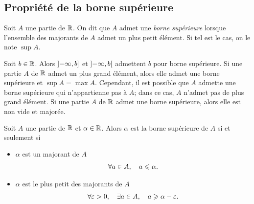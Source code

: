 \documentclass{magnolia}
\begin{document}
\subsection{Propriété de la borne supérieure}


\begin{definition}[utile=-3]
Soit $A$ une partie de $\mathbb{R}$. On dit que $A$ admet une \emph{borne supérieure} lorsque
l'ensemble des majorants de $A$ admet un plus petit élément. Si tel est le cas,
on le note $\sup A$.
\end{definition}

\begin{remarques}
\remarque Soit $b\in\mathbb{R}$. Alors $\left]-\infty,b\right]$ et $\left]-\infty,b\right[$
  admettent $b$ pour borne supérieure.
\remarque Si une partie $A$ de $\mathbb{R}$ admet un plus grand élément, alors elle
  admet une borne supérieure et $\sup A = \max A$. Cependant, il est possible
  que $A$ admette une borne supérieure qui n'appartienne pas à $A$; dans ce cas,
  $A$ n'admet pas de plus grand élément.
\remarque Si une partie $A$ de $\mathbb{R}$ admet une borne supérieure, alors elle est
  non vide et majorée.
\end{remarques}

\begin{proposition}
  Soit $A$ une partie de $\mathbb{R}$ et $\alpha\in\mathbb{R}$. Alors $\alpha$ est la borne supérieure
  de $A$ si et seulement si
  \begin{itemize}
  \item $\alpha$ est un majorant de $A$
    \[\forall a\in A ,\quad a\leqslant\alpha.\]
  \item $\alpha$ est le plus petit des majorants de $A$
    \[\forall \varepsilon>0 ,\quad \exists a\in A ,\quad a\geqslant \alpha-\varepsilon.\]
  \end{itemize}
  \end{proposition}
  
\end{document}
